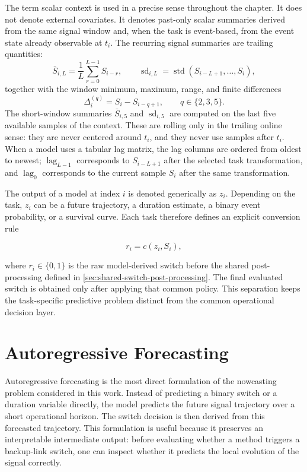 The term scalar context is used in a precise sense throughout the chapter. It
does not denote external covariates. It denotes past-only scalar summaries
derived from the same signal window and, when the task is event-based, from the
event state already observable at \(t_i\). The recurring signal summaries are
trailing quantities:
\[
  \bar{S}_{i,L}
  =
  \frac{1}{L}\sum_{r=0}^{L-1} S_{i-r},
  \qquad
  \operatorname{sd}_{i,L}
  =
  \operatorname{std}(S_{i-L+1},\ldots,S_i),
\]
together with the window minimum, maximum, range, and finite differences
\[
  \Delta_i^{(q)} = S_i - S_{i-q+1},
  \qquad q\in\{2,3,5\}.
\]
The short-window summaries \(\bar{S}_{i,5}\) and
\(\operatorname{sd}_{i,5}\) are computed on the last five available samples of
the context. These are rolling only in the trailing online sense: they are never
centered around \(t_i\), and they never use samples after \(t_i\). When a model
uses a tabular lag matrix, the lag columns are ordered from oldest to newest;
\(\operatorname{lag}_{L-1}\) corresponds to \(S_{i-L+1}\) after the selected
task transformation, and \(\operatorname{lag}_{0}\) corresponds to the current
sample \(S_i\) after the same transformation.

The output of a model at index \(i\) is denoted generically as \(z_i\). Depending
on the task, \(z_i\) can be a future trajectory, a duration estimate, a binary
event probability, or a survival curve. Each task therefore defines an explicit
conversion rule

\[
  r_i = c(z_i, S_i),
\]

where \(r_i \in \{0,1\}\) is the raw model-derived switch before the shared
post-processing defined in \cref{sec:shared-switch-post-processing}. The final
evaluated switch is obtained only after applying that common policy. This
separation keeps the task-specific predictive problem distinct from the common
operational decision layer.

\section{Autoregressive Forecasting}
\label{sec:autoregressive-formulation}

Autoregressive forecasting is the most direct formulation of the nowcasting
problem considered in this work. Instead of predicting a binary switch or a
duration variable directly, the model predicts the future signal trajectory over
a short operational horizon. The switch decision is then derived from this
forecasted trajectory. This formulation is useful because it preserves an
interpretable intermediate output: before evaluating whether a method triggers a
backup-link switch, one can inspect whether it predicts the local evolution of
the signal correctly.

